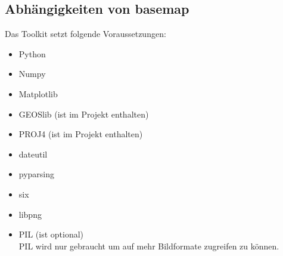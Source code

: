 \subsection{Abhängigkeiten von basemap}
Das Toolkit setzt folgende Voraussetzungen:
\newline
\begin{itemize}
 \item Python
 \item Numpy
 \item Matplotlib
 \item GEOSlib (ist im Projekt enthalten)
 \item PROJ4 (ist im Projekt enthalten)
 \item dateutil
 \item pyparsing
 \item six
 \item libpng
 \\
 \item PIL (ist optional)\\
 PIL wird nur gebraucht um auf mehr Bildformate zugreifen zu können. 
\end{itemize}
